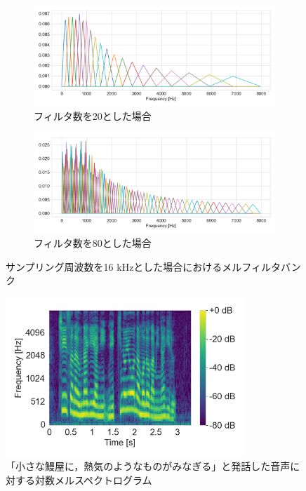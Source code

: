 \begin{figure}[tb]
    \centering
    \begin{subfigure}[b]{1.0\textwidth}
        \centering
        \includegraphics[width=140mm]{./figure/sec2/melfb/onedim_20.png}
        \caption{フィルタ数を20とした場合}
        \label{sec2:fig:melfb_20}
    \end{subfigure}

    \vspace{0.5cm}

    \begin{subfigure}[b]{1.0\textwidth}
        \centering
        \includegraphics[width=140mm]{./figure/sec2/melfb/onedim_80.png}
        \caption{フィルタ数を80とした場合}
        \label{sec2:fig:melfb_80}
    \end{subfigure}
    \caption{サンプリング周波数を16 kHzとした場合におけるメルフィルタバンク}
    \label{sec2:fig:melfb}
\end{figure}

\begin{figure}[bt]
    \centering
    \includegraphics[height=60mm]{./figure/sec2/melspectrogram.png}
    \caption{「小さな鰻屋に，熱気のようなものがみなぎる」と発話した音声に対する対数メルスペクトログラム}
    \label{sec2:fig:melspectrogram}
\end{figure}